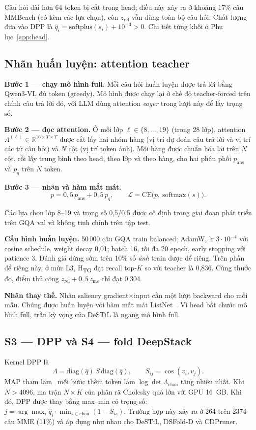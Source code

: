\documentclass[conference]{IEEEtran}
\newcommand{\qhat}{\ensuremath{\hat{q}}}
\newcommand{\Htg}{H\textsubscript{TG}}
\begin{document}
Câu hỏi dài hơn 64 token bị cắt trong head; điều này xảy ra ở khoảng 17\% câu MMBench (có kèm các lựa chọn), còn $z_\text{rel}$ vẫn dùng toàn bộ câu hỏi. Chất lượng đưa vào DPP là $\qhat_i=\mathrm{softplus}(s_i)+10^{-3}>0$. Chi tiết từng khối ở Phụ lục~\ref{app:head}.

\subsection{Nhãn huấn luyện: attention teacher}
\label{sec:teacher}
\textbf{Bước 1 --- chạy mô hình full.} Mỗi câu hỏi huấn luyện được trả lời bằng Qwen3-VL đủ token (greedy). Mô hình được chạy lại ở chế độ teacher-forced trên chính câu trả lời đó, với LLM dùng attention \emph{eager} trong lượt này để lấy trọng số.

\textbf{Bước 2 --- đọc attention.} Ở mỗi lớp $\ell\in\{8,\dots,19\}$ (trong 28 lớp), attention $A^{(\ell)}\in\mathbb{R}^{16\times T\times T}$ được cắt lấy hai nhóm hàng (vị trí dự đoán câu trả lời và vị trí các từ câu hỏi) và $N$ cột (vị trí token ảnh). Mỗi hàng được chuẩn hóa lại trên $N$ cột, rồi lấy trung bình theo head, theo lớp và theo hàng, cho hai phân phối $p_\text{ans}$ và $p_q$ trên $N$ token.

\textbf{Bước 3 --- nhãn và hàm mất mát.}
\begin{equation}
p = 0{,}5\,p_\text{ans} + 0{,}5\,p_q,\qquad \mathcal{L}=\mathrm{CE}\big(p,\ \mathrm{softmax}(s)\big).
\end{equation}

Các lựa chọn lớp 8--19 và trọng số 0,5/0,5 được cố định trong giai đoạn phát triển trên GQA val và không tinh chỉnh trên tập test.

\textbf{Cấu hình huấn luyện.} 50\,000 câu GQA train balanced; AdamW, lr $3\cdot10^{-4}$ với cosine schedule, weight decay 0,01; batch 16, tối đa 20 epoch, early stopping với patience 3. Đánh giá dừng sớm trên 10\% số \emph{ảnh} train được để riêng. Trên phần để riêng này, ở mức L3, \Htg{} đạt recall top-$K$ so với teacher là 0,836. Cùng thước đo, điểm thủ công $z_\text{rel}+0{,}5\,z_\text{ms}$ chỉ đạt 0,304.

\textbf{Nhãn thay thế.} Nhãn saliency gradient$\times$input cần một lượt backward cho mỗi mẫu. Chúng được huấn luyện với hàm mất mát ListNet~\cite{cao2007listnet}. Vì head bắt chước mô hình full, trần kỳ vọng của DeSTiL là ngang mô hình full.

\subsection{S3 --- DPP và S4 --- fold DeepStack}
\label{sec:fold}
Kernel DPP là
\begin{equation}
\Lambda=\mathrm{diag}(\qhat)\,S\,\mathrm{diag}(\qhat),\qquad S_{ij}=\cos(v_i,v_j).
\end{equation}
MAP tham lam~\cite{chen2018fastmap} mỗi bước thêm token làm $\log\det\Lambda_\text{chọn}$ tăng nhiều nhất. Khi $N>4096$, ma trận $N\times K$ của phân rã Cholesky quá lớn với GPU 16~GB. Khi đó, DPP được thay bằng max--min có trọng số: $j=\arg\max_i \qhat_i\cdot\min_{s\in\text{chọn}}(1-S_{is})$. Trường hợp này xảy ra ở 264 trên 2374 câu MME (11\%) và áp dụng như nhau cho DeSTiL, DSFold-D và CDPruner.
\end{document}
